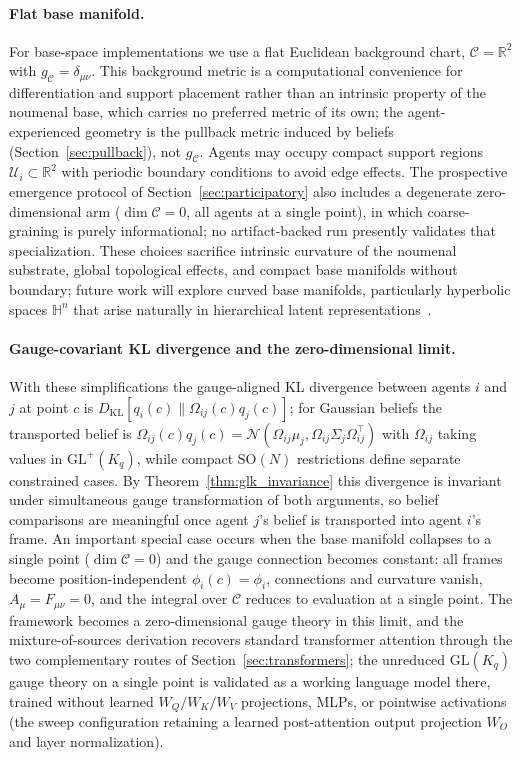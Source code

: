 \documentclass[11pt]{article}
\begin{document}
\paragraph{Flat base manifold.}
For base-space implementations we use a flat Euclidean background chart, $\mathcal{C} = \mathbb{R}^2$ with $g_{\mathcal{C}} = \delta_{\mu\nu}$. This background metric is a computational convenience for differentiation and support placement rather than an intrinsic property of the noumenal base, which carries no preferred metric of its own; the agent-experienced geometry is the pullback metric induced by beliefs (Section~\ref{sec:pullback}), not $g_{\mathcal{C}}$. Agents may occupy compact support regions $\mathcal{U}_i \subset \mathbb{R}^2$ with periodic boundary conditions to avoid edge effects. The prospective emergence protocol of Section~\ref{sec:participatory} also includes a degenerate zero-dimensional arm ($\dim\mathcal{C}=0$, all agents at a single point), in which coarse-graining is purely informational; no artifact-backed run presently validates that specialization. These choices sacrifice intrinsic curvature of the noumenal substrate, global topological effects, and compact base manifolds without boundary; future work will explore curved base manifolds, particularly hyperbolic spaces $\mathbb{H}^n$ that arise naturally in hierarchical latent representations~\cite{Nickel2017}.

\paragraph{Gauge-covariant KL divergence and the zero-dimensional limit.}
With these simplifications the gauge-aligned KL divergence between agents $i$ and $j$ at point $c$ is $D_{\mathrm{KL}}[q_i(c) \| \Omega_{ij}(c)q_j(c)]$; for Gaussian beliefs the transported belief is $\Omega_{ij}(c)q_j(c) = \mathcal{N}(\Omega_{ij}\mu_j, \Omega_{ij}\Sigma_j\Omega_{ij}^\top)$ with $\Omega_{ij}$ taking values in $\mathrm{GL}^+(K_q)$, while compact $\mathrm{SO}(N)$ restrictions define separate constrained cases. By Theorem~\ref{thm:glk_invariance} this divergence is invariant under simultaneous gauge transformation of both arguments, so belief comparisons are meaningful once agent $j$'s belief is transported into agent $i$'s frame. An important special case occurs when the base manifold collapses to a single point ($\dim\mathcal{C} = 0$) and the gauge connection becomes constant: all frames become position-independent $\phi_i(c) = \phi_i$, connections and curvature vanish, $A_\mu = F_{\mu\nu} = 0$, and the integral over $\mathcal{C}$ reduces to evaluation at a single point. The framework becomes a zero-dimensional gauge theory in this limit, and the mixture-of-sources derivation recovers standard transformer attention through the two complementary routes of Section~\ref{sec:transformers}; the unreduced $\mathrm{GL}(K_q)$ gauge theory on a single point is validated as a working language model there, trained without learned $W_Q/W_K/W_V$ projections, MLPs, or pointwise activations (the sweep configuration retaining a learned post-attention output projection $W_O$ and layer normalization).
\end{document}
